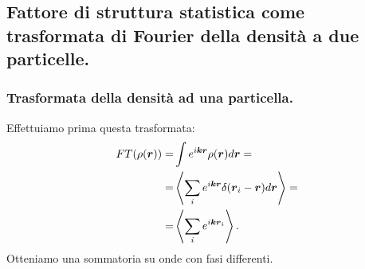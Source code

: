 \subsection{Fattore di struttura statistica come trasformata di Fourier della densità a due particelle.}
\label{subsec:Fattore di struttura statistica come trasformata di Fourier della densità a due particelle.}
\subsubsection{Trasformata della densità ad una particella.}
\label{subsubsec:Trasformata della densità ad una particella.}
Effettuiamo prima questa trasformata:
\[\begin{aligned}
	FT(\rho (\boldsymbol{r})) =&
	\int e^{i \boldsymbol{k}\boldsymbol{r}}\rho (\boldsymbol{r})d \boldsymbol{r} =\\
	=&
	\left<\sum_{i}^{} e^{i \boldsymbol{k}\boldsymbol{r}} \delta(\boldsymbol{r}_i -\boldsymbol{r})d \boldsymbol{r} \right> =\\
	=&
	\left<\sum_{i}^{} e^{i \boldsymbol{k}\boldsymbol{r}_i} \right>
.\end{aligned}\]
Otteniamo una sommatoria su onde con fasi differenti.
